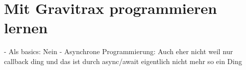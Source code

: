 \chapter{Mit Gravitrax programmieren lernen}
    - Als basics: Nein
    - Asynchrone Programmierung: Auch eher nicht weil nur callback ding und das ist durch async/await eigentlich nicht mehr so ein Ding